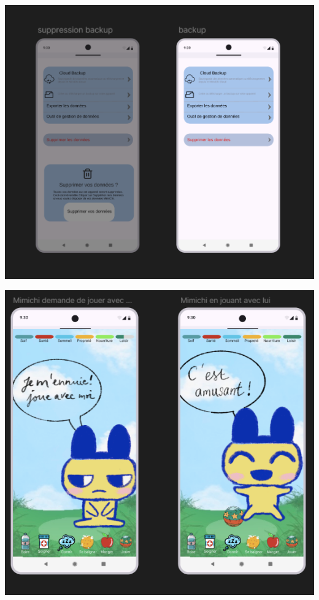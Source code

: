 \documentclass{cahier_des_charges}
\begin{document}
\begin{minipage}[t]{0.48\textwidth}
    \includegraphics[width=\linewidth]{maquette/screen9.png}
\end{minipage}
\hfill
\begin{minipage}[t]{0.48\textwidth}
    \includegraphics[width=\linewidth]{maquette/screen4.png}
\end{minipage}\par\vspace{0.3cm}
\end{document}
